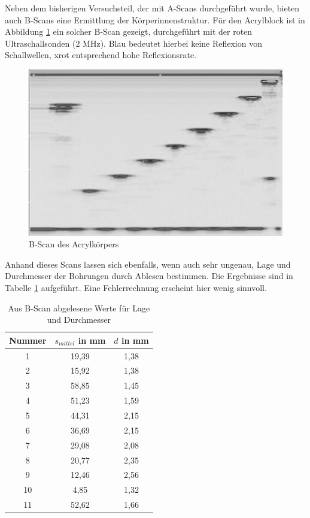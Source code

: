 Neben dem bisherigen Versuchsteil, der mit A-Scans durchgeführt wurde, bieten auch B-Scans eine Ermittlung der Körperinnenstruktur.
Für den Acrylblock ist in Abbildung \ref{pic_bscan} ein solcher B-Scan gezeigt, durchgeführt mit der roten Ultraschallsonden (2 MHz). 
Blau bedeutet hierbei keine Reflexion von Schallwellen, xrot entsprechend hohe Reflexionsrate.

\begin{figure}[H]
 \includegraphics[width=1\textwidth]{pics/bscan-oben.jpg}
 \caption{B-Scan des Acrylkörpers}
 \label{pic_bscan}
\end{figure}

Anhand dieses Scans lassen sich ebenfalls, wenn auch sehr ungenau, Lage und Durchmesser der Bohrungen durch Ablesen bestimmen. Die
Ergebnisse sind in Tabelle \ref{tab_bscan} aufgeführt. Eine Fehlerrechnung erscheint hier wenig sinnvoll.

\begin{table}[H]
 \begin{tabular}{c|c|c}
Nummer & $s_{mittel}$ in mm & $d$ in mm\\
\hline
\hline
1	&19,39	&1,38 \\
2	&15,92	&1,38\\
\hline
3	&58,85	&1,45\\
4	&51,23	&1,59\\
5	&44,31	&2,15\\
6	&36,69	&2,15\\
7	&29,08	&2,08\\
8	&20,77	&2,35\\
9	&12,46	&2,56\\
10	&4,85	&1,32\\
\hline
11	&52,62	&1,66

 \end{tabular}
\caption{Aus B-Scan abgelesene Werte für Lage und Durchmesser}
\label{tab_bscan}
\end{table}

